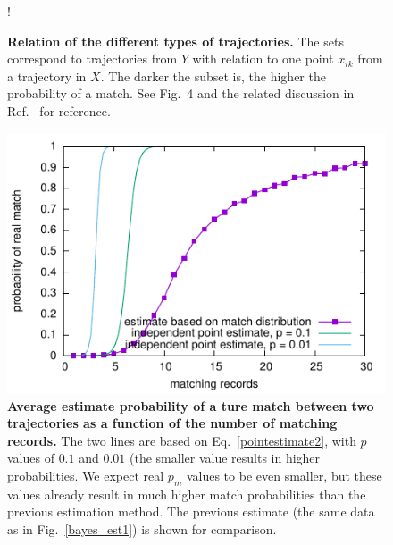 \documentclass[a4paper]{article}
\begin{document}
\def \firstcircle  {(0,0) circle (3cm)}
\def \secondcircle {(0,0) circle (2cm)}
\def \thirdcircle  {(0,0) circle (1cm)}
\begin {figure}
\centering
{} {!} {}
\caption {{\bf Relation of the different types of trajectories.} The sets correspond to trajectories from $Y$ with relation to one point $x_{ik}$ from
	a trajectory in $X$. The darker the subset is, the higher the probability of a match. See Fig.~4 and the related discussion in Ref.~\cite{Juhasz}
	for reference.}
	\label {trsets}
\end {figure}

		\begin{figure}
			\centering
			\includegraphics{bayes_est2}
			\caption{{\bf Average estimate probability of a ture match between two trajectories as a function of the number of matching records.}
				The two lines are based on Eq.~\ref{pointestimate2}, with $p$ values of $0.1$ and $0.01$ (the smaller value results in higher
				probabilities. We expect real $p_m$ values to be even smaller, but these values already result in much higher match probabilities
				than the previous estimation method. The previous estimate (the same data as in Fig.~\ref{bayes_est1}) is shown for comparison.}
			\label{bayes_est2}
		\end{figure}
		
\end{document}

